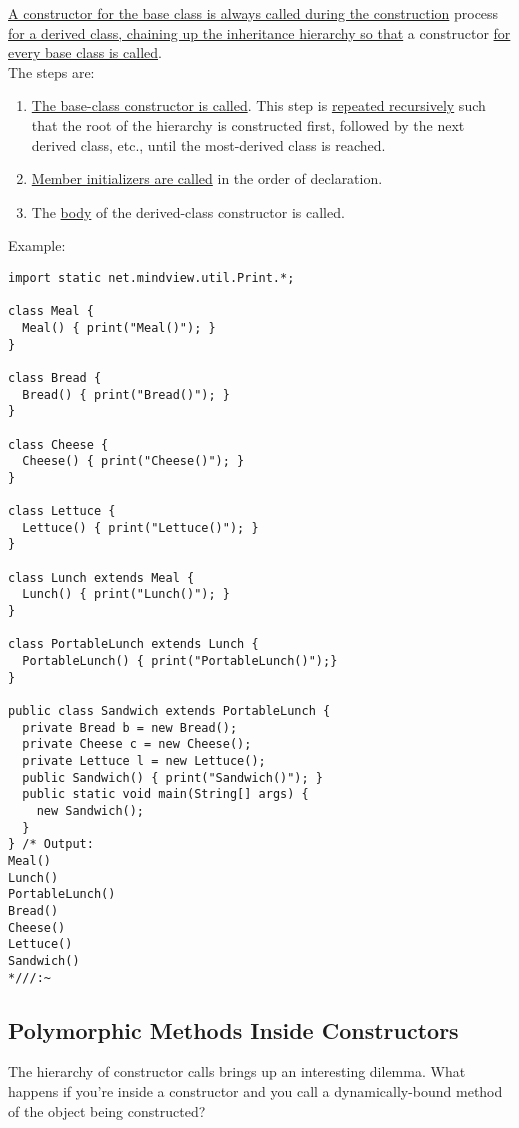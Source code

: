 \documentclass[10pt,letterpaper]{report}
\begin{document}
\underline{A constructor for the base class is always called during the construction} process \underline{for a derived class, chaining up the inheritance hierarchy so that} a constructor \underline{for every base class is called}.\\

The steps are:
\begin{enumerate}
\item \underline{The base-class constructor is called}. This step is \underline{repeated recursively} such that the root of the hierarchy is constructed first, followed by the next derived class, etc., until the most-derived class is reached.
\item \underline{Member initializers are called} in the order of declaration.
\item The \underline{body} of the derived-class constructor is called.
\end{enumerate}

Example:
\begin{lstlisting}
import static net.mindview.util.Print.*;

class Meal {
  Meal() { print("Meal()"); }
}

class Bread {
  Bread() { print("Bread()"); }
}

class Cheese {
  Cheese() { print("Cheese()"); }
}

class Lettuce {
  Lettuce() { print("Lettuce()"); }
}

class Lunch extends Meal {
  Lunch() { print("Lunch()"); }
}

class PortableLunch extends Lunch {
  PortableLunch() { print("PortableLunch()");}
}

public class Sandwich extends PortableLunch {
  private Bread b = new Bread();
  private Cheese c = new Cheese();
  private Lettuce l = new Lettuce();
  public Sandwich() { print("Sandwich()"); }
  public static void main(String[] args) {
    new Sandwich();
  }
} /* Output:
Meal()
Lunch()
PortableLunch()
Bread()
Cheese()
Lettuce()
Sandwich()
*///:~
\end{lstlisting}
\subsection{Polymorphic Methods Inside Constructors}
The hierarchy of constructor calls brings up an interesting dilemma. What happens if you're inside a constructor and you call a dynamically-bound method of the object being constructed?\\
\end{document}
